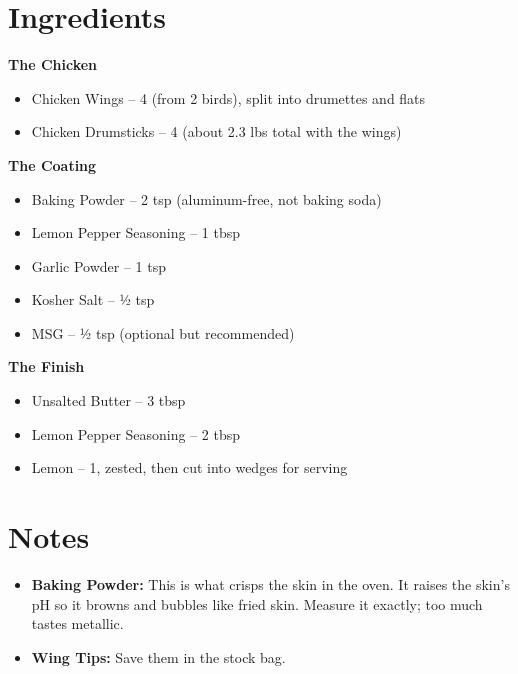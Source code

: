 




\section*{Ingredients}

\textbf{The Chicken}
\begin{itemize}[itemsep=0.1em, label={\raisebox{-0.1ex}{\large\textbullet}}]
      \item[\cut] Chicken Wings – 4 (from 2 birds), split into drumettes and flats
      \item Chicken Drumsticks – 4 (about 2.3 lbs total with the wings)
\end{itemize}

\textbf{The Coating}
\begin{itemize}[itemsep=0.1em, label={\raisebox{-0.1ex}{\large\textbullet}}]
      \item[\measure] Baking Powder – 2 tsp (aluminum-free, not baking soda)
      \item[\measure] Lemon Pepper Seasoning – 1 tbsp
      \item[\measure] Garlic Powder – 1 tsp
      \item[\measure] Kosher Salt – ½ tsp
      \item[\measure] MSG – ½ tsp (optional but recommended)
\end{itemize}

\textbf{The Finish}
\begin{itemize}[itemsep=0.1em, label={\raisebox{-0.1ex}{\large\textbullet}}]
      \item Unsalted Butter – 3 tbsp
      \item[\measure] Lemon Pepper Seasoning – 2 tbsp
      \item[\cut] Lemon – 1, zested, then cut into wedges for serving
\end{itemize}

\section*{Notes}

\begin{itemize}
      \item \textbf{Baking Powder:} This is what crisps the skin in the oven. It raises the skin's pH so it browns and bubbles like fried skin. Measure it exactly; too much tastes metallic.
      \item \textbf{Wing Tips:} Save them in the stock bag.
\end{itemize}

